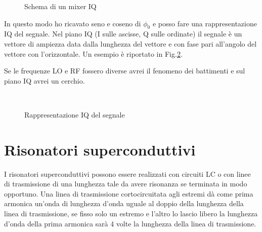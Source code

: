 \documentclass{article}
\begin{document}
\begin{figure}[htbp]
    \centering
    \caption{Schema di un mixer IQ}
    \label{fig:mixerIQ}
\end{figure}

In questo modo ho ricavato seno e coseno di $\phi_0$ e posso fare una rappresentazione IQ del segnale.
Nel piano IQ (I sulle ascisse, Q sulle ordinate) il segnale è un vettore di ampiezza data dalla lunghezza del vettore e con fase pari all'angolo del vettore con l'orizzontale.
Un esempio è riportato in Fig.\ref{fig:rapprIQ}.

Se le frequenze LO e RF fossero diverse avrei il fenomeno dei battimenti e sul piano IQ avrei un cerchio.
\begin{figure}
    \centering
    \caption{Rappresentazione IQ del segnale}\
    \label{fig:rapprIQ}
\end{figure}

\section{Risonatori superconduttivi}
I risonatori superconduttivi possono essere realizzati con circuiti LC o con linee di trasmissione di una lunghezza tale da avere risonanza se terminata in modo opportuno.
Una linea di trasmissione cortocircuitata agli estremi dà come prima armonica un'onda di lunghezza d'onda uguale al doppio della lunghezza della linea di trasmissione, 
se fisso solo un estremo e l'altro lo lascio libero la lunghezza d'onda della prima armonica sarà 4 volte la lunghezza della linea di trasmissione.
\end{document}
